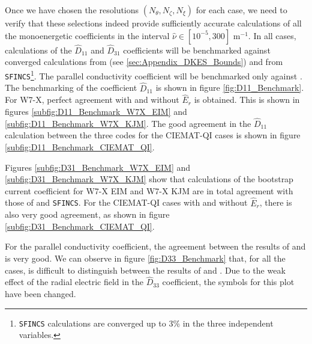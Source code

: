 Once we have chosen the resolutions $(N_\theta,N_\zeta,N_\xi)$ for each case, we need to verify that these selections indeed provide sufficiently accurate calculations of all the monoenergetic coefficients in the interval $\hat{\nu}\in[10^{-5},300]$ $\text{m}^{-1} $. In all cases, {\MONKES} calculations of the $\widehat{D}_{11}$ and $\widehat{D}_{31}$ coefficients will be benchmarked against converged calculations from {\DKES} (see \ref{sec:Appendix_DKES_Bounds}) and from \texttt{SFINCS}\footnote{\texttt{SFINCS} calculations are converged up to 3\% in the three independent variables.}. The parallel conductivity coefficient will be benchmarked only against {\DKES}. The benchmarking of the coefficient $\widehat{D}_{11}$ is shown in figure \ref{fig:D11_Benchmark}. For W7-X, perfect agreement with and without $\hat{E}_r$ is obtained. This is shown in figures \ref{subfig:D11_Benchmark_W7X_EIM} and \ref{subfig:D11_Benchmark_W7X_KJM}. The good agreement in the $\widehat{D}_{11}$ calculation between the three codes for the CIEMAT-QI cases is shown in figure \ref{subfig:D11_Benchmark_CIEMAT_QI}. 

Figures \ref{subfig:D31_Benchmark_W7X_EIM} and \ref{subfig:D31_Benchmark_W7X_KJM} show that {\MONKES} calculations of the bootstrap current coefficient for W7-X EIM and W7-X KJM are in total agreement with those of {\DKES} and \texttt{SFINCS}. For the CIEMAT-QI cases with and without $\hat{E}_r$, there is also very good agreement, as shown in figure \ref{subfig:D31_Benchmark_CIEMAT_QI}.
%

For the parallel conductivity coefficient, the agreement between the results of {\MONKES} and {\DKES} is very good. We can observe in figure \ref{fig:D33_Benchmark} that, for all the cases, is difficult to distinguish between the results of {\MONKES} and {\DKES}. Due to the weak effect of the radial electric field in the $\widehat{D}_{33}$ coefficient, the symbols for this plot have been changed. 
%






